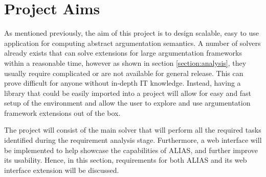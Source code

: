 \section{Project Aims}
As mentioned previously, the aim of this project is to design scalable, easy to use application for computing abstract argumentation semantics. A number of solvers already exists that can solve extensions for large argumentation frameworks within a reasonable time, however as shown in section \ref{section:analysis}, they usually require complicated or are not available for general release. This can prove difficult for anyone without in-depth IT knowledge. Instead, having a library that could be easily imported into a project will allow for easy and fast setup of the environment and allow the user to explore and use argumentation framework extensions out of the box.

The project will consist of the main solver that will perform all the required tasks identified during the requirement analysis stage. Furthermore, a web interface will be implemented to help showcase the capabilities of ALIAS, and further improve its usability. Hence, in this section, requirements for both ALIAS and its web interface extension will be discussed. 